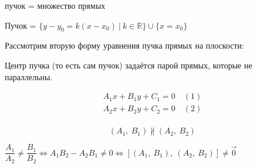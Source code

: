 \documentclass{article}
\theoremstyle{definition}
\begin{document}
пучок = множество прямых

Пучок = $\{y - y_0 = k(x - x_0)\ |\ k\in \mathbb{R}\}\cup \{x = x_0\}$

Рассмотрим вторую форму уравнения пучка прямых на плоскости:

Центр пучка (то есть сам пучок) задаётся парой прямых, которые не параллельны.

$$\begin{matrix}
A_1x + B_1y + C_1 = 0\quad (1)\\
A_2x + B_2y + C_2 = 0\quad (2)\\
\end{matrix}$$

$$\left(A_1,\ B_1\right) \nparallel \left(A_2,\ B_2\right)$$

$\dfrac{A_1}{A_2} \neq \dfrac{B_1}{B_2} \Longleftrightarrow A_1B_2 - A_2B_1\neq 0 \Longleftrightarrow \left[\left(A_1,\ B_1\right),\ \left(A_2,\ B_2\right)\right] \neq \vec 0$
\end{document}
